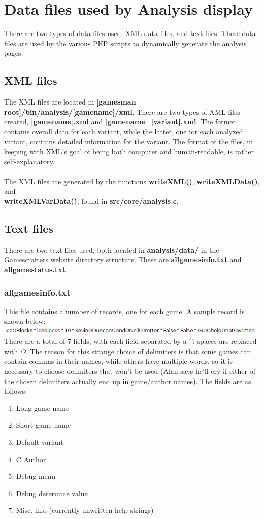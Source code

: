 \documentclass[11pt]{article}
\begin{document}
\section{Data files used by Analysis display}
There are two types of data files used: XML data files, and text files. These data files are used by the various PHP scripts to dynamically generate the analysis pages.
\subsection{XML files}
The XML files are located in \textbf{[gamesman root]/bin/analysis/[gamename]/xml}. There are two types of XML files created, \textbf{[gamename].xml} and \textbf{[gamename\_[variant].xml}. The former contains overall data for each variant, while the latter, one for each analyzed variant, contains detailed information for the variant. The format of the files, in keeping with XML's goal of being both computer and human-readable, is rather self-explanatory.
\\\\The XML files are generated by the functions \textbf{writeXML()}, \textbf{writeXMLData()}, and \\\textbf{writeXMLVarData()}, found in \textbf{src/core/analysis.c}.
\subsection{Text files}
\label{textfiles}
There are two text files used, both located in \textbf{analysis/data/} in the Gamescrafters website directory structure. These are \textbf{allgamesinfo.txt} and \textbf{allgamestatus.txt}.
\subsubsection{allgamesinfo.txt}
This file contains a number of records, one for each game. A sample record is shown below:
\includegraphics[scale=.70]{allgamesinfo_record.png} 
\\There are a total of 7 fields, with each field separated by a \textbf{\^}; spaces are replaced with $\Omega$. The reason for this strange choice of delimiters is that some games can contain commas in their names, while others have multiple words, so it is necessary to choose delimiters that won't be used (Alan says he'll cry if either of the chosen delimiters actually end up in game/author names). The fields are as follows:
\begin{enumerate}
\item Long game name
\item Short game name
\item Default variant
\item C Author
\item Debug menu
\item Debug determine value
\item Misc. info (currently unwritten help strings)
\end{enumerate}
\end{document}
